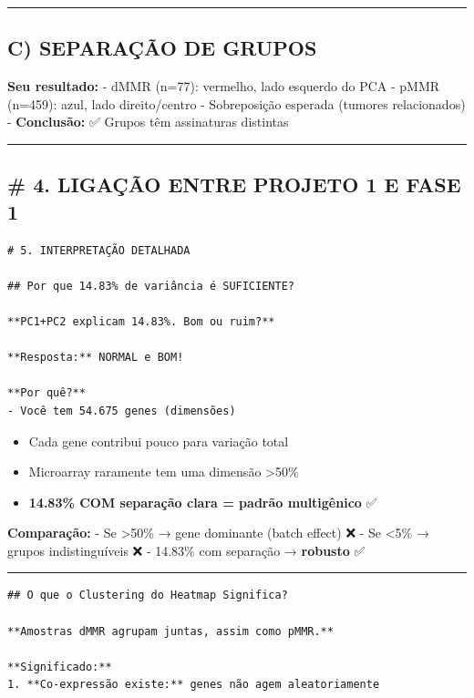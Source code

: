 \documentclass[
]{article}
\providecommand{\tightlist}{%
  \setlength{\itemsep}{0pt}\setlength{\parskip}{0pt}}
\begin{document}
\begin{center}\rule{0.5\linewidth}{0.5pt}\end{center}

\subsection{C) SEPARAÇÃO DE GRUPOS}\label{c-separauxe7uxe3o-de-grupos}

\textbf{Seu resultado:} - dMMR (n=77): vermelho, lado esquerdo do PCA -
pMMR (n=459): azul, lado direito/centro - Sobreposição esperada (tumores
relacionados) - \textbf{Conclusão:} ✅ Grupos têm assinaturas distintas

\begin{center}\rule{0.5\linewidth}{0.5pt}\end{center}

\subsection{\# 4. LIGAÇÃO ENTRE PROJETO 1 E FASE
1}\label{ligauxe7uxe3o-entre-projeto-1-e-fase-1}

\begin{verbatim}
# 5. INTERPRETAÇÃO DETALHADA

## Por que 14.83% de variância é SUFICIENTE?

**PC1+PC2 explicam 14.83%. Bom ou ruim?**

**Resposta:** NORMAL e BOM!

**Por quê?**
- Você tem 54.675 genes (dimensões)
\end{verbatim}

\begin{itemize}
\tightlist
\item
  Cada gene contribui pouco para variação total
\item
  Microarray raramente tem uma dimensão \textgreater50\%
\item
  \textbf{14.83\% COM separação clara = padrão multigênico} ✅
\end{itemize}

\textbf{Comparação:} - Se \textgreater50\% → gene dominante (batch
effect) ❌ - Se \textless5\% → grupos indistinguíveis ❌ - 14.83\% com
separação → \textbf{robusto} ✅

\begin{center}\rule{0.5\linewidth}{0.5pt}\end{center}

\begin{verbatim}
## O que o Clustering do Heatmap Significa?

**Amostras dMMR agrupam juntas, assim como pMMR.**

**Significado:**
1. **Co-expressão existe:** genes não agem aleatoriamente
\end{verbatim}
\end{document}
